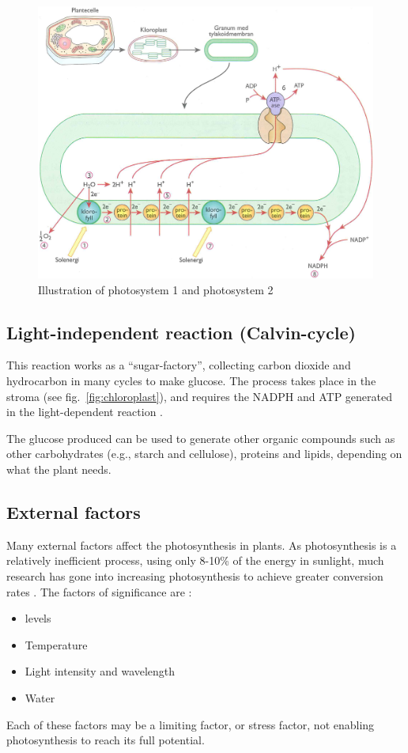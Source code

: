 \begin{figure}
\centering
\includegraphics[width=\textwidth]{img/photosynthesis/light_dependent.png}
\caption{Illustration of photosystem 1 and photosystem 2 \citep{bios}}
\label{fig:photosystem}
\end{figure}

\subsection{Light-independent reaction (Calvin-cycle)}
This reaction works as a “sugar-factory”, collecting carbon dioxide and hydrocarbon in many cycles to make glucose. The process takes place in the stroma (see fig.~\ref{fig:chloroplast}), and requires the NADPH and ATP generated in the light-dependent reaction \citep{bi2}. 

The glucose produced can be used to generate other organic compounds such as other carbohydrates (e.g., starch and cellulose), proteins and lipids, depending on what the plant needs.

\subsection{External factors}
Many external factors affect the photosynthesis in plants. As photosynthesis is a relatively inefficient process, using only 8-10\% of the energy in sunlight, much research has gone into increasing photosynthesis to achieve greater conversion rates \citep{kirschbaum2011does}. The factors of significance are \citep{bios}:
\begin{itemize}
\item {} levels
\item Temperature
\item Light intensity and wavelength
\item Water
\end{itemize}
Each of these factors may be a limiting factor, or stress factor, not enabling photosynthesis to reach its full potential. 

